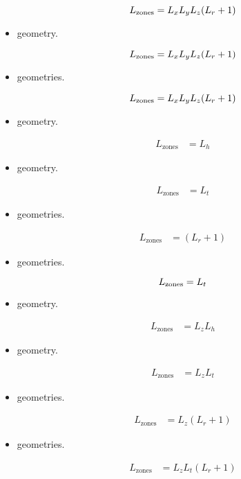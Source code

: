 \begin{itemize}
$$L_{\rm{zones}}=L_x L_y L_z (L_r+1) $$

\item {} geometry.

$$L_{\rm{zones}}=L_x L_y L_z (L_r+1) $$

\item {} geometries.

$$L_{\rm{zones}}=L_x L_y L_z (L_r+1) $$

\item {} geometry.

\begin{align*}L_{\text{zones}}&=L_h\end{align*}

\item {} geometry.

\begin{align*}L_{\text{zones}}&=L_{t}\end{align*}

\item {} geometries.

\begin{align*}L_{\text{zones}}&=(L_r+1) \end{align*}

\item {} geometries.

$$L_{\rm{zones}}=L_{t}$$

\item {} geometry.

\begin{align*}L_{\text{zones}}&=L_z L_h\end{align*}

\item {} geometry.

\begin{align*}L_{\text{zones}}&=L_z L_{t}\end{align*}

\item {} geometries.

\begin{align*}L_{\text{zones}}&=L_z (L_r+1) \end{align*}

\item {} geometries.

\begin{align*}L_{\text{zones}}&=L_z L_{t} (L_r+1) \end{align*}

\end{itemize}

